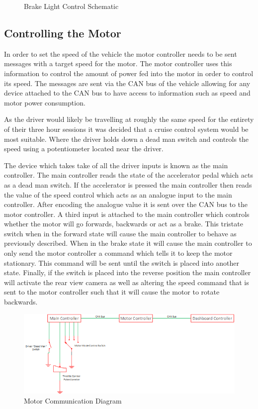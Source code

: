 \begin{figure}[H]
\begin{center}

\caption{Brake Light Control Schematic}
\label{Fig:BrakeLightsWiring}
\end{center}
\end{figure}

\subsection{Controlling the Motor}
In order to set the speed of the vehicle the motor controller needs to be sent messages with a target speed for the motor. The motor controller uses this information to control the amount of power fed into the motor in order to control its speed. The messages are sent via the CAN bus of the vehicle allowing for any device attached to the CAN bus to have access to information such as speed and motor power consumption. 

As the driver would likely be travelling at roughly the same speed for the entirety of their three hour sessions it was decided that a cruise control system would be most suitable. Where the driver holds down a dead man switch and controls the speed using a potentiometer located near the driver.

The device which takes take of all the driver inputs is known as the main controller. The main controller reads the state of the accelerator pedal which acts as a dead man switch. If the accelerator is pressed the main controller then reads the value of the speed control which acts as an analogue input to the main controller. After encoding the analogue value it is sent over the CAN bus to the motor controller. A third input is attached to the main controller which controls whether the motor will go forwards, backwards or act as a brake. This tristate switch when in the forward state will cause the main controller to behave as previously described. When in the brake state it will cause the main controller to only send the motor controller a command which tells it to keep the motor stationary. This command will be sent until the switch is placed into another state. Finally, if the switch is placed into the reverse position the main controller will activate the rear view camera as well as altering the speed command that is sent to the motor controller such that it will cause the motor to rotate backwards.

\begin{figure}[H]
\includegraphics[width=\columnwidth]{figures/MotorControlDiagram.png}%
\caption{Motor Communication Diagram}
\label{Fig:MotorControl}
\end{figure}

